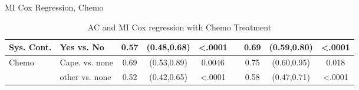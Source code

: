 \begin{frame}{MI Cox Regression, Chemo}
\begin{table}[]
{\begin{tabular}{|l|l|c|c|c|c|c|c|c|}
Sys. Cont.                     & Yes vs. No                       & 0.57                                                & (0.48,0.68)           & \textless .0001       &                       & 0.69                  & (0.59,0.80) & \textless .0001                                             \\ \hline
\rowcolor[HTML]{FE0000} 
Chemo                          & Cape. vs. none                   & 0.69                                                & (0.53,0.89)           & 0.0046                &                       & 0.75                  & (0.60,0.95) & 0.018                                                       \\ \hline
\rowcolor[HTML]{FE0000} 
                        
                        & other vs. none                   & 0.52                                                & (0.42,0.65)           & \textless .0001       &                       & 0.58                  & (0.47,0.71) & \textless .0001                                             \\ \hline
\end{tabular}
}
\caption{AC and MI Cox regression with Chemo Treatment}
\label{acmi_cox_chemo}
\end{table} 
\end{frame}


